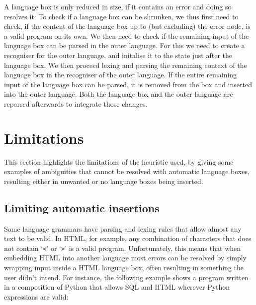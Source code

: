 \documentclass[sigplan,screen]{acmart}\settopmatter{printfolios=true,printccs=false,printacmref=false}
\newcommand{\qtt}[1]{`\texttt{#1}'\xspace}
\begin{document}

A language box is only reduced in size, if it contains an error and doing so
resolves it.  To check if a language box can be shrunken, we thus first need to
check, if the content of the language box up to (but excluding) the error node,
is a valid program on its own.  We then need to check if the remaining input of
the language box can be parsed in the outer language. For this we need to
create a recogniser for the outer language, and initalise it to the state just
after the language box. We then proceed lexing and parsing the remaining
context of the language box in the recogniser of the outer language. If the
entire remaining input of the language box can be parsed, it is removed from
the box and inserted into the outer language. Both the language box and the
outer language are reparsed afterwards to integrate those changes.



\section{Limitations}
\label{sec_lbox_limitations}

This section highlights the limitations of the heuristic used, by giving some
examples of ambiguities that cannot be resolved with automatic language boxes,
resulting either in unwanted or no language boxes being inserted.


\subsection{Limiting automatic insertions}
\label{subsec:limitingautoinserts}

Some language grammars have parsing and lexing rules that allow almost any text to be valid.
In HTML, for example, any combination of characters that does not contain
\qtt{<} or \qtt{>} is a valid program. Unfortunately, this means that when
embedding HTML into another language most errors can be resolved by simply wrapping input inside a
HTML language box, often resulting in something the user didn't intend. For
instance, the following example shows a program written in a composition of
Python that allows SQL and HTML wherever Python expressions are valid:
\end{document}
